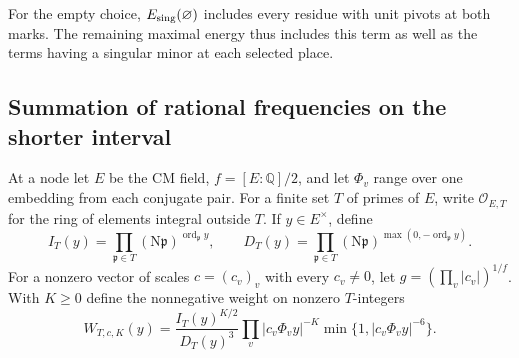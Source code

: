\documentclass[a4paper,11pt]{article}
\theoremstyle{definition}
\theoremstyle{remark}
\numberwithin{equation}{section}
\begin{document}
For the empty choice, \(E_{\rm sing}(\varnothing)\) includes every
residue with unit pivots at both marks. The remaining maximal energy
thus includes this term as well as the terms having a singular
minor at each selected place.
\clearpage

\subsection{Summation of rational frequencies on the shorter interval}
\label{sec:freqnode875}

At a node let \(E\) be the CM field, \(f=[E:\mathbb Q]/2\), and let
\(\Phi_v\) range over one embedding from each conjugate pair. For a finite
set \(T\) of primes of \(E\), write \(\mathcal O_{E,T}\) for the ring of
elements integral outside \(T\). If \(y\in E^\times\), define
\[
 I_T(y)=\prod_{\mathfrak p\in T}
      (\mathrm N\mathfrak p)^{\operatorname{ord}_{\mathfrak p}y},
 \qquad
 D_T(y)=\prod_{\mathfrak p\in T}
      (\mathrm N\mathfrak p)^{\max(0,-\operatorname{ord}_{\mathfrak p}y)}.
\]
For a nonzero vector of scales \(c=(c_v)_v\) with every \(c_v\ne0\),
let \(g=(\prod_v|c_v|)^{1/f}\). With \(K\ge0\) define the nonnegative
weight on nonzero \(T\)-integers
\begin{equation}
 W_{T,c,K}(y)=
 \frac{I_T(y)^{K/2}}{D_T(y)^3}
 \prod_v |c_v\Phi_v y|^{-K}
                    \min\{1,|c_v\Phi_v y|^{-6}\}.
 \label{eq:freqweight875}
\end{equation}
\end{document}
